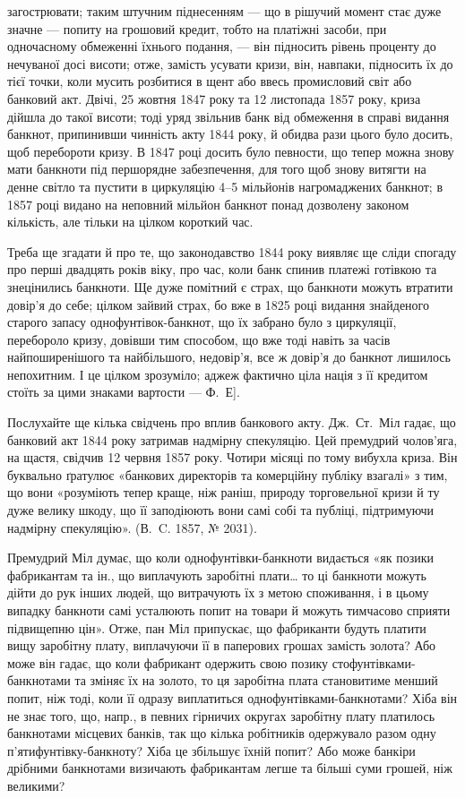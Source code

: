\parcont{}  %
загострювати; таким штучним піднесенням — що в рішучий момент стає дуже
значне — попиту на грошовий кредит, тобто на платіжні засоби, при одночасному
обмеженні їхнього подання, — він підносить рівень проценту до нечуваної досі
висоти; отже, замість усувати кризи, він, навпаки, підносить їх до тієї точки,
коли мусить розбитися в щент або ввесь промисловий світ або банковий акт.
Двічі, 25 жовтня 1847 року та 12 листопада 1857 року, криза дійшла до такої
висоти; тоді уряд звільнив банк від обмеження в справі видання банкнот, припинивши
чинність акту 1844 року, й обидва рази цього було досить, щоб перебороти
кризу. В 1847 році досить було певности, що тепер можна знову мати
банкноти під першорядне забезпечення, для того щоб знову витягти на денне
світло та пустити в циркуляцію 4--5 мільйонів нагромаджених банкнот; в
1857 році видано на неповний мільйон банкнот понад дозволену законом кількість,
але тільки на цілком короткий час.

Треба ще згадати й про те, що законодавство 1844 року виявляє ще сліди
спогаду про перші двадцять років віку, про час, коли банк спинив платежі готівкою
та знецінились банкноти. Ще дуже помітний є страх, що банкноти можуть
втратити довір’я до себе; цілком зайвий страх, бо вже в 1825 році видання
знайденого старого запасу однофунтівок-банкнот, що їх забрано було з
циркуляції, перебороло кризу, довівши тим способом, що вже тоді навіть за часів
найпоширенішого та найбільшого, недовір’я, все ж довір’я до банкнот лишилось
непохитним. І це цілком зрозуміло; аджеж фактично ціла нація з її кредитом
стоїть за цими знаками вартости — Ф.~Е].

Послухайте ще кілька свідчень про вплив банкового акту. Дж.~Ст.~Міл
гадає, що банковий акт 1844 року затримав надмірну спекуляцію. Цей премудрий
чолов’яга, на щастя, свідчив 12 червня 1857 року. Чотири місяці по тому
вибухла криза. Він буквально ґратулює «банкових директорів та комерційну
публіку взагалі» з тим, що вони «розуміють тепер краще, ніж раніш, природу
торговельної кризи й ту дуже велику шкоду, що її заподіюють вони самі собі
та публіці, підтримуючи надмірну спекуляцію». (В.~C. 1857, № 2031).

Премудрий Міл думає, що коли однофунтівки-банкноти видається «як позики
фабрикантам та ін., що виплачують заробітні плати\dots{} то ці банкноти
можуть дійти до рук інших людей, що витрачують їх з метою споживання, і в
цьому випадку банкноти самі усталюють попит на товари й можуть тимчасово
сприяти підвищепню цін». Отже, пан Міл припускає, що фабриканти будуть
платити вищу заробітну плату, виплачуючи її в паперових грошах замість золота?
Або може він гадає, що коли фабрикант одержить свою позику стофунтівками-банкнотами
та зміняє їх на золото, то ця заробітна плата становитиме менший
попит, ніж тоді, коли її одразу виплатиться однофунтівками-банкнотами? Хіба
він не знає того, що, напр., в певних гірничих округах заробітну плату платилось
банкнотами місцевих банків, так що кілька робітників одержувало разом
одну п’ятифунтівку-банкноту? Хіба це збільшує їхній попит? Або може банкіри
дрібними банкнотами визичають фабрикантам легше та більші суми грошей,
ніж великими?

